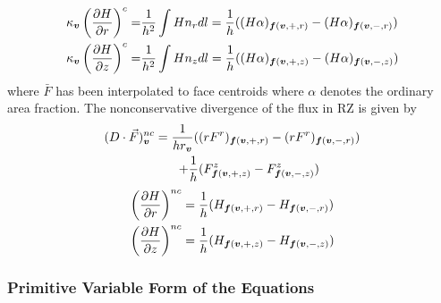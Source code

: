 \begin{gather}
\begin{align*}
\kappa_{\boldsymbol{v}} \left(\frac{\partial H}{\partial r}\right)^c =&  
\frac{1}{h^2} \int H n_r dl  =  \frac{1}{h}( (H
\alpha)_{{\boldsymbol{f}}({\boldsymbol{v}},+,r)} - (H \alpha)_{{\boldsymbol{f}}({\boldsymbol{v}},-,r)})  \\
\kappa_{\boldsymbol{v}} \left(\frac{\partial H}{\partial z}\right)^c =&  
\frac{1}{h^2} \int H n_z dl  =  \frac{1}{h}( (H
\alpha)_{{\boldsymbol{f}}({\boldsymbol{v}},+,z)} - (H \alpha)_{{\boldsymbol{f}}({\boldsymbol{v}},-,z)})  
\end{align*}
\end{gather}
where $\bar{F}$ has been interpolated to face centroids where $\alpha$
denotes the ordinary area fraction.   The nonconservative divergence
of the flux in RZ is given by
\begin{gather*}
\begin{align*}
(D \cdot \vec{F})^{nc}_{\boldsymbol{v}} = \frac{1}{h r_{\boldsymbol{v}}}
( &(r {F}^r)_{{\boldsymbol{f}}({\boldsymbol{v}},+,r)} - (r {F}^r )_{{\boldsymbol{f}}({\boldsymbol{v}},-,r)})   \\
+ \frac{1}{h}&(F^z_{{\boldsymbol{f}}({\boldsymbol{v}},+,z)} - F^z_{{\boldsymbol{f}}({\boldsymbol{v}},-,z)} )
\end{align*}
\end{gather*}
\begin{gather*}
\begin{align*}
\left(\frac{\partial H}{\partial r}\right)^{nc} &=  
\frac{1}{h} (H_{{\boldsymbol{f}}({\boldsymbol{v}},+,r)} - H_{{\boldsymbol{f}}({\boldsymbol{v}},-,r)}) \\
\left(\frac{\partial H}{\partial z}\right)^{nc} &=  
\frac{1}{h} (H_{{\boldsymbol{f}}({\boldsymbol{v}},+,z)} - H_{{\boldsymbol{f}}({\boldsymbol{v}},-,z)}) 
\end{align*}
\end{gather*}

\subsubsection{Primitive Variable Form of the Equations}

